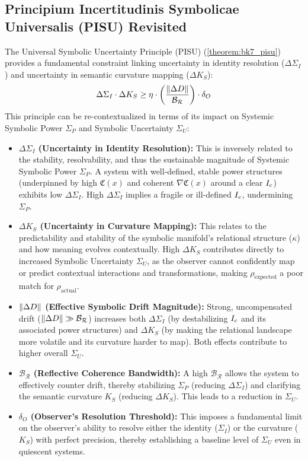 \subsection{Principium Incertitudinis Symbolicae Universalis (PISU) Revisited}
\label{subsec:bk7_pisu_revisited_power_uncertainty}
The Universal Symbolic Uncertainty Principle (PISU) (\ref{theorem:bk7_pisu}) provides a fundamental constraint linking uncertainty in identity resolution (\(\Delta\Sigma_I\)) and uncertainty in semantic curvature mapping (\(\Delta K_S\)):
\[
\Delta\Sigma_I \cdot \Delta K_S \geq \eta \cdot \left(\frac{\|\Delta D\|}{\mathcal{B_R}}\right) \cdot \delta_O
\]
This principle can be re-contextualized in terms of its impact on Systemic Symbolic Power \(\Sigma_P\) and Symbolic Uncertainty \(\Sigma_U\):
\begin{itemize}
    \item \textbf{\(\Delta\Sigma_I\) (Uncertainty in Identity Resolution):} This is inversely related to the stability, resolvability, and thus the sustainable magnitude of Systemic Symbolic Power \(\Sigma_P\). A system with well-defined, stable power structures (underpinned by high \(\mathfrak{C}(x)\) and coherent \(\nabla \mathfrak{C}(x)\) around a clear \(I_c\)) exhibits low \(\Delta\Sigma_I\). High \(\Delta\Sigma_I\) implies a fragile or ill-defined \(I_c\), undermining \(\Sigma_P\).
    \item \textbf{\(\Delta K_S\) (Uncertainty in Curvature Mapping):} This relates to the predictability and stability of the symbolic manifold's relational structure (\(\kappa\)) and how meaning evolves contextually. High \(\Delta K_S\) contributes directly to increased Symbolic Uncertainty \(\Sigma_U\), as the observer cannot confidently map or predict contextual interactions and transformations, making \(\rho_{\text{expected}}\) a poor match for \(\rho_{\text{actual}}\).
    \item \textbf{\(\|\Delta D\|\) (Effective Symbolic Drift Magnitude):} Strong, uncompensated drift (\(\|\Delta D\| \gg \mathcal{B_R}\)) increases both \(\Delta\Sigma_I\) (by destabilizing \(I_c\) and its associated power structures) and \(\Delta K_S\) (by making the relational landscape more volatile and its curvature harder to map). Both effects contribute to higher overall \(\Sigma_U\).
    \item \textbf{\(\mathcal{B_R}\) (Reflective Coherence Bandwidth):} A high \(\mathcal{B_R}\) allows the system to effectively counter drift, thereby stabilizing \(\Sigma_P\) (reducing \(\Delta\Sigma_I\)) and clarifying the semantic curvature \(K_S\) (reducing \(\Delta K_S\)). This leads to a reduction in \(\Sigma_U\).
    \item \textbf{\(\delta_O\) (Observer's Resolution Threshold):} This imposes a fundamental limit on the observer's ability to resolve either the identity (\(\Sigma_I\)) or the curvature (\(K_S\)) with perfect precision, thereby establishing a baseline level of \(\Sigma_U\) even in quiescent systems.
\end{itemize}
